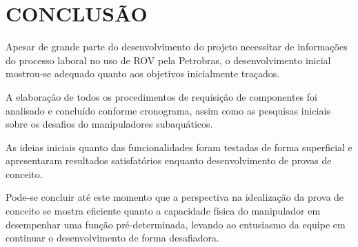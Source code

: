 \chapter{CONCLUSÃO}
\label{chap:concl}
Apesar de grande parte do desenvolvimento do projeto necessitar de informações do processo laboral no uso de ROV pela Petrobras, o desenvolvimento inicial mostrou-se adequado quanto aos objetivos inicialmente traçados.

A elaboração de todos os procedimentos de requisição de componentes foi analisado e concluído conforme cronograma, assim como as pesquisas iniciais sobre os desafios do manipuladores subaquáticos. 

As ideias iniciais quanto das funcionalidades foram testadas de forma superficial e apresentaram resultados satisfatórios enquanto desenvolvimento de provas de conceito.

Pode-se concluir até este momento que a perspectiva na idealização da prova de conceito se mostra eficiente quanto a capacidade física do manipulador em desempenhar uma função pré-determinada, levando ao entusiasmo da equipe em continuar o desenvolvimento de forma desafiadora.


